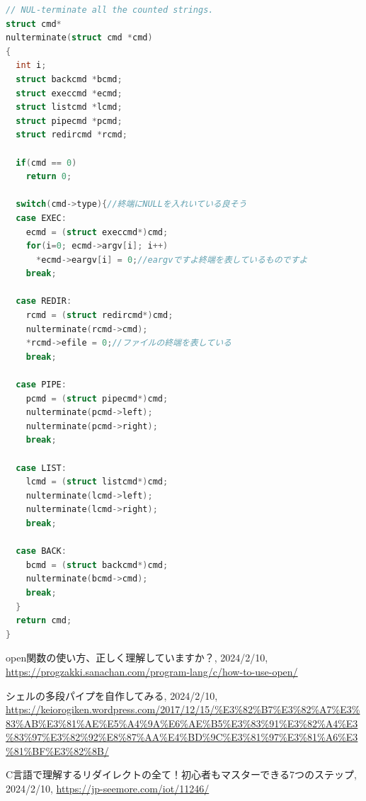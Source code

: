 \documentclass[a4j, twocolumn]{ltjsarticle}
\begin{document}
\begin{lstlisting}[language=C,caption=XV6のコード]
// NUL-terminate all the counted strings.
struct cmd*
nulterminate(struct cmd *cmd)
{
  int i;
  struct backcmd *bcmd;
  struct execcmd *ecmd;
  struct listcmd *lcmd;
  struct pipecmd *pcmd;
  struct redircmd *rcmd;

  if(cmd == 0)
    return 0;

  switch(cmd->type){//終端にNULLを入れいている良そう
  case EXEC:
    ecmd = (struct execcmd*)cmd;
    for(i=0; ecmd->argv[i]; i++)
      *ecmd->eargv[i] = 0;//eargvですよ終端を表しているものですよ
    break;

  case REDIR:
    rcmd = (struct redircmd*)cmd;
    nulterminate(rcmd->cmd);
    *rcmd->efile = 0;//ファイルの終端を表している
    break;

  case PIPE:
    pcmd = (struct pipecmd*)cmd;
    nulterminate(pcmd->left);
    nulterminate(pcmd->right);
    break;

  case LIST:
    lcmd = (struct listcmd*)cmd;
    nulterminate(lcmd->left);
    nulterminate(lcmd->right);
    break;

  case BACK:
    bcmd = (struct backcmd*)cmd;
    nulterminate(bcmd->cmd);
    break;
  }
  return cmd;
}
  \end{lstlisting}


  
  \begin{thebibliography}{99}
      open関数の使い方、正しく理解していますか？,
			2024/2/10,
			\url{https://progzakki.sanachan.com/program-lang/c/how-to-use-open/}

      シェルの多段パイプを自作してみる,
			2024/2/10,
			\url{https://keiorogiken.wordpress.com/2017/12/15/%E3%82%B7%E3%82%A7%E3%83%AB%E3%81%AE%E5%A4%9A%E6%AE%B5%E3%83%91%E3%82%A4%E3%83%97%E3%82%92%E8%87%AA%E4%BD%9C%E3%81%97%E3%81%A6%E3%81%BF%E3%82%8B/}

			C言語で理解するリダイレクトの全て！初心者もマスターできる7つのステップ,
			2024/2/10,
			\url{https://jp-seemore.com/iot/11246/}
			
	\end{thebibliography}
\end{document}

